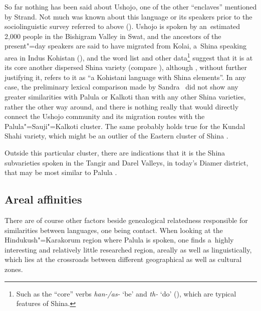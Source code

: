 \largerpage[-1]
So far nothing has been said about Ushojo, one of the other ``enclaves'' mentioned by Strand. Not much was known about this language or its speakers prior to the sociolinguistic survey referred to above (\citealt{decker1992}). Ushojo is spoken by an~estimated 2,000 people in the Bishigram Valley in Swat, and the ancestors of the present"=day speakers are said to have migrated from Kolai, a~Shina speaking area in Indus Kohistan (\citealt[69]{decker1992}), and the word list and other data\footnote{Such as the ``core'' verbs \textit{han-/as-} `be' and \textit{th-} `do' (\citealt[ 71--72, 199--203]{decker1992}), which are typical features of Shina.} suggest that it is at its core another dispersed Shina variety (compare \citealt[255]{strand2001}), although \citet[9]{zoller2005}, without further justifying it, refers to it as ``a Kohistani language with Shina elements''. In any case, the preliminary lexical comparison made by Sandra~\citet[70]{decker1992} did not show any greater similarities with Palula or Kalkoti than with any other Shina varieties, rather the other way around, and there is nothing really that would directly connect the Ushojo community and its migration routes with the Palula"=Sauji"=Kalkoti cluster. The same probably holds true for the Kundal Shahi variety, which might be an outlier of the Eastern cluster of Shina \citep[9]{baartrehman2005}.


Outside this particular cluster, there are indications that it is the Shina subvarieties spoken in the Tangir and Darel Valleys, in today's Diamer district, that may be most similar to Palula \citep[142--143]{radloff1992}. 


\subsection{Areal affinities}
\label{subsec:1-3-2}

There are of course other factors beside genealogical relatedness responsible for similarities between languages, one being contact. When looking at the Hindukush"=Karakorum region where Palula is spoken, one finds a~highly interesting and relatively little researched region, areally as well as linguistically, which lies at the crossroads between different geographical as well as cultural zones. 


